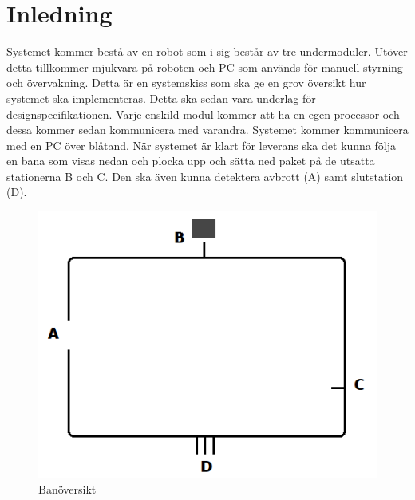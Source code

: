\section{Inledning}
Systemet kommer bestå av en robot som i sig består av tre undermoduler. Utöver detta tillkommer mjukvara på roboten och PC som används för manuell styrning och övervakning. Detta är en systemskiss som ska ge en grov översikt hur systemet ska implementeras. Detta ska sedan vara underlag för designspecifikationen. 
\newline
\newline
Varje enskild modul kommer att ha en egen processor och dessa kommer sedan kommunicera med varandra. Systemet kommer kommunicera med en PC över blåtand. När systemet är klart för leverans ska det kunna följa en bana som visas nedan och plocka upp och sätta ned paket på de utsatta stationerna B och C. Den ska även kunna detektera avbrott (A) samt slutstation (D). 

\begin{figure}[h]
\includegraphics[scale=0.4]{figur}
\caption{Banöversikt}
\end{figure}

